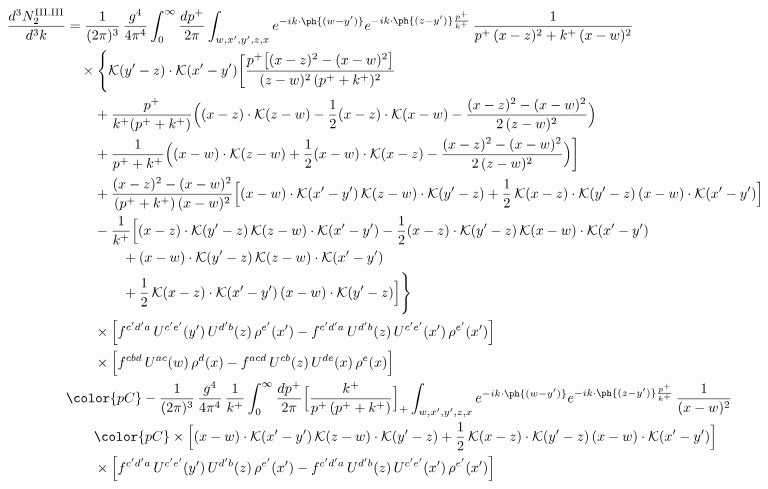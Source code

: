 \begin{align}
\frac{d^{3}N^{\rm III.III}_{2}}{d^{3}k} & =\frac{1}{(2\pi)^{3}}\,\frac{g^{4}}{4\pi^{4}}\int_{0}^{\infty}\frac{dp^{+}}{2\pi}\int_{w,x',y',z,x}e^{-ik\cdot\ph{(w-y')}}e^{-ik\cdot\ph{(z-y')}\frac{p^{+}}{k^{+}}}\,\frac{1}{p^{+}\,(x-z)^{2}+k^{+}\,(x-w)^{2}}\notag\\
&\quad\times\Bigg\{\mathcal{K}(y'-z)\cdot\mathcal{K}(x'-y')\bigg[\frac{p^{+}\big[(x-z)^{2}-(x-w)^{2}\big]}{(z-w)^{2}\,(p^{+}+k^{+})^{2}}\notag\\
&\qquad+\frac{p^{+}}{k^{+}(p^{+}+k^{+})}\Big((x-z)\cdot\mathcal{K}(z-w)-\frac{1}{2}(x-z)\cdot\mathcal{K}(x-w)-\frac{(x-z)^{2}-(x-w)^{2}}{2\,(z-w)^{2}}\Big)\notag\\
&\qquad+\frac{1}{p^{+}+k^{+}}\Big((x-w)\cdot\mathcal{K}(z-w)+\frac{1}{2}(x-w)\cdot\mathcal{K}(x-z)-\frac{(x-z)^{2}-(x-w)^{2}}{2\,(z-w)^{2}}\Big)\bigg]\notag\\
&\qquad+\frac{(x-z)^{2}-(x-w)^{2}}{(p^{+}+k^{+})\,(x-w)^{2}}\Big[(x-w)\cdot\mathcal{K}(x'-y')\,\mathcal{K}(z-w)\cdot\mathcal{K}(y'-z)+\frac{1}{2}\,\mathcal{K}(x-z)\cdot\mathcal{K}(y'-z)\,(x-w)\cdot\mathcal{K}(x'-y')\Big]\notag\\
&\qquad-\frac{1}{k^{+}}\Big[(x-z)\cdot\mathcal{K}(y'-z)\,\mathcal{K}(z-w)\cdot\mathcal{K}(x'-y')-\frac{1}{2}(x-z)\cdot\mathcal{K}(y'-z)\,\mathcal{K}(x-w)\cdot\mathcal{K}(x'-y')\notag\\
&\qquad\qquad+(x-w)\cdot\mathcal{K}(y'-z)\,\mathcal{K}(z-w)\cdot\mathcal{K}(x'-y')\notag\\
&\qquad\qquad+\frac{1}{2}\,\mathcal{K}(x-z)\cdot\mathcal{K}(x'-y')\,(x-w)\cdot\mathcal{K}(y'-z)\Big]\Bigg\}\notag\\
&\qquad\times\Big[f^{c'd'a}\,U^{c'e'}(y')\,U^{d'b}(z)\,\rho^{e'}(x')-f^{c'd'a}\,U^{d'b}(z)\,U^{c'e'}(x')\,\rho^{e'}(x')\Big]\notag\\
&\qquad\times\Big[f^{cbd}\,U^{ac}(w)\,\rho^{d}(x)-f^{acd}\,U^{cb}(z)\,U^{de}(x)\,\rho^{e}(x)\Big]\notag\\
&{\color{pC}-\frac{1}{(2\pi)^{3}}\,\frac{g^{4}}{4\pi^{4}}\,\frac{1}{k^{+}}\int_{0}^{\infty}\frac{dp^{+}}{2\pi}\Big[\frac{k^{+}}{p^{+}\,(p^{+}+k^{+})}\Big]_{+}\int_{w,x',y',z,x}e^{-ik\cdot\ph{(w-y')}}e^{-ik\cdot\ph{(z-y')}\frac{p^{+}}{k^{+}}}\,\frac{1}{(x-w)^{2}}}\notag\\
&\qquad{\color{pC}\times\Big[(x-w)\cdot\mathcal{K}(x'-y')\,\mathcal{K}(z-w)\cdot\mathcal{K}(y'-z)+\frac{1}{2}\,\mathcal{K}(x-z)\cdot\mathcal{K}(y'-z)\,(x-w)\cdot\mathcal{K}(x'-y')\Big]}\notag\\
&\qquad\times\Big[f^{c'd'a}\,U^{c'e'}(y')\,U^{d'b}(z)\,\rho^{e'}(x')-f^{c'd'a}\,U^{d'b}(z)\,U^{c'e'}(x')\,\rho^{e'}(x')\Big]\notag\\

\end{align}
